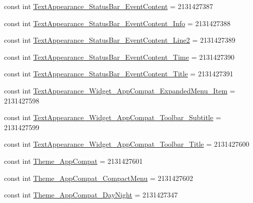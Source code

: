 \begin{DoxyCompactItemize}
\item 
const int \mbox{\hyperlink{class_f_w_p_s___app_1_1_droid_1_1_resource_1_1_style_ac38608a54e9bb3e03bf0be85195bd203}{Text\+Appearance\+\_\+\+Status\+Bar\+\_\+\+Event\+Content}} = 2131427387
\item 
const int \mbox{\hyperlink{class_f_w_p_s___app_1_1_droid_1_1_resource_1_1_style_ac6c34133f8abd8914d75d00f4b4b706b}{Text\+Appearance\+\_\+\+Status\+Bar\+\_\+\+Event\+Content\+\_\+\+Info}} = 2131427388
\item 
const int \mbox{\hyperlink{class_f_w_p_s___app_1_1_droid_1_1_resource_1_1_style_a47b86bd0523552e45f334a771ba9e79d}{Text\+Appearance\+\_\+\+Status\+Bar\+\_\+\+Event\+Content\+\_\+\+Line2}} = 2131427389
\item 
const int \mbox{\hyperlink{class_f_w_p_s___app_1_1_droid_1_1_resource_1_1_style_af30255a637ea24e76b7c99947707be71}{Text\+Appearance\+\_\+\+Status\+Bar\+\_\+\+Event\+Content\+\_\+\+Time}} = 2131427390
\item 
const int \mbox{\hyperlink{class_f_w_p_s___app_1_1_droid_1_1_resource_1_1_style_ade2ef4f6aafe09d219661e2aaca7092c}{Text\+Appearance\+\_\+\+Status\+Bar\+\_\+\+Event\+Content\+\_\+\+Title}} = 2131427391
\item 
const int \mbox{\hyperlink{class_f_w_p_s___app_1_1_droid_1_1_resource_1_1_style_a501d1ae6909382cf33a22ffef0ca191a}{Text\+Appearance\+\_\+\+Widget\+\_\+\+App\+Compat\+\_\+\+Expanded\+Menu\+\_\+\+Item}} = 2131427598
\item 
const int \mbox{\hyperlink{class_f_w_p_s___app_1_1_droid_1_1_resource_1_1_style_a5b82eb1e8711e49550e1128a900621ba}{Text\+Appearance\+\_\+\+Widget\+\_\+\+App\+Compat\+\_\+\+Toolbar\+\_\+\+Subtitle}} = 2131427599
\item 
const int \mbox{\hyperlink{class_f_w_p_s___app_1_1_droid_1_1_resource_1_1_style_a1eb79479837da1c4b42f224db9091c66}{Text\+Appearance\+\_\+\+Widget\+\_\+\+App\+Compat\+\_\+\+Toolbar\+\_\+\+Title}} = 2131427600
\item 
const int \mbox{\hyperlink{class_f_w_p_s___app_1_1_droid_1_1_resource_1_1_style_ab58d0d8e9940017d8727011cb75feaaa}{Theme\+\_\+\+App\+Compat}} = 2131427601
\item 
const int \mbox{\hyperlink{class_f_w_p_s___app_1_1_droid_1_1_resource_1_1_style_ad1db12ae32b527cee0874b5f3155da00}{Theme\+\_\+\+App\+Compat\+\_\+\+Compact\+Menu}} = 2131427602
\item 
const int \mbox{\hyperlink{class_f_w_p_s___app_1_1_droid_1_1_resource_1_1_style_a7e7f65e02c1e9e0a52d42c1094323b58}{Theme\+\_\+\+App\+Compat\+\_\+\+Day\+Night}} = 2131427347

\end{DoxyCompactItemize}
